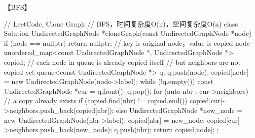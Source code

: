 【BFS】
\begin{Code}
	// LeetCode, Clone Graph
	// BFS，时间复杂度O(n)，空间复杂度O(n)
	class Solution {
		UndirectedGraphNode *cloneGraph(const UndirectedGraphNode *node) {
			if (node == nullptr) return nullptr;
			// key is original node，value is copied node
			unordered_map<const UndirectedGraphNode *,
			UndirectedGraphNode *> copied;
			// each node in queue is already copied itself
			// but neighbors are not copied yet
			queue<const UndirectedGraphNode *> q;
			q.push(node);
			copied[node] = new UndirectedGraphNode(node->label);
			while (!q.empty()) {
				const UndirectedGraphNode *cur = q.front();
				q.pop();
				for (auto nbr : cur->neighbors) {
					// a copy already exists
					if (copied.find(nbr) != copied.end()) {
						copied[cur]->neighbors.push_back(copied[nbr]);
					} else {
					UndirectedGraphNode *new_node =
					new UndirectedGraphNode(nbr->label);
					copied[nbr] = new_node;
					copied[cur]->neighbors.push_back(new_node);
					q.push(nbr);
				}
			}
		}
		return copied[node];
	}
};
\end{Code}

